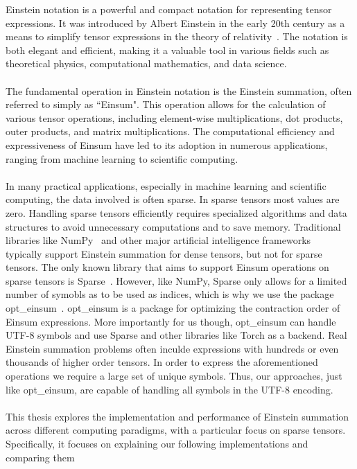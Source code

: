 Einstein notation is a powerful and compact notation for representing
tensor expressions. It was introduced by Albert Einstein in the early 20th century
as a means to simplify tensor expressions in the theory of relativity~\cite{einstein1916}.
The notation is both elegant and efficient, making it a valuable tool in various
fields such as theoretical physics, computational mathematics, and data science.
\\\\
The fundamental operation in Einstein notation is the Einstein summation,
often referred to simply as ``Einsum". This operation allows for the calculation of
various tensor operations, including element-wise multiplications, dot products,
outer products, and matrix multiplications. The computational efficiency and
expressiveness of Einsum have led to its adoption in numerous applications,
ranging from machine learning to scientific computing.
\\\\
In many practical applications, especially in machine learning and scientific computing,
the data involved is often sparse. In sparse tensors most values are zero. Handling sparse
tensors efficiently requires specialized algorithms and data structures to avoid
unnecessary computations and to save memory. Traditional libraries like NumPy~\cite{numpy}
and other major artificial intelligence frameworks~\cite{tensorflow, pytorch} typically
support Einstein summation for dense tensors, but not for sparse tensors. The only known
library that aims to support Einsum operations on sparse tensors is Sparse~\cite{sparse}.
However, like NumPy, Sparse only allows for a limited number of symobls as to be used as
indices, which is why we use the package opt\_einsum~\cite{opt_einsum}. opt\_einsum is a
package for optimizing the contraction order of Einsum expressions. More importantly for us
though, opt\_einsum can handle UTF-8 symbols and use Sparse and other libraries like Torch
as a backend. Real Einstein summation problems often inculde expressions with hundreds or
even thousands of higher order tensors. In order to express the aforementioned operations
we require a large set of unique symbols. Thus, our approaches, just like opt\_einsum, are
capable of handling all symbols in the UTF-8 encoding.
\\\\
This thesis explores the implementation and performance of Einstein summation
across different computing paradigms, with a particular focus on sparse tensors.
Specifically, it focuses on explaining our following implementations and comparing them
